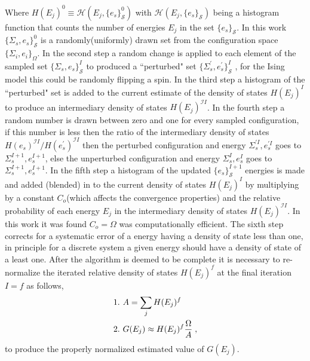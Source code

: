 \documentclass[aps,prl,reprint,superscriptaddress,showkeys]{revtex4-1}
\begin{document}
Where  $H(E_j)^0 \equiv \mathcal{H}(E_j,\{e_s\}_{\mathcal{S}}^0)$ with $\mathcal{H}(E_j,\{e_s\}_{\mathcal{S}})$ being a histogram function that counts the number of energies $E_j$ in the set $\{e_s\}_{\mathcal{S}}$. In this work $\{\Sigma_{s},e_s\}_{\mathcal{S}}^0$  is a randomly(uniformly) drawn set from the configuration space $\{ \Sigma_i, e_i \}_\Omega $. In the second step  a random change is applied to each element of the sampled set $\{\Sigma_{s},e_s\}_{\mathcal{S}}^I$ to produced a ``perturbed" set $ \{\Sigma_{s}^{'},e_s^{'}\}_{\mathcal{S}}^I$ , for the Ising model this could be randomly flipping a spin. In the third step a histogram of the ``perturbed" set is added to the current estimate of the density of states $H(E_j)^I$ to produce an intermediary density of states $H(E_j)^{\mathcal{I}I}$. In the fourth step a random number is drawn between zero and one for every sampled configuration, if this number is less then the ratio of the intermediary density of states $H(e_s)^{\mathcal{I}I}/H(e_s^{'})^{\mathcal{I}I}$ then the perturbed configuration and energy  $\Sigma_{s}^{'I},e_s^{'I}$  goes to $\Sigma_{s}^{I+1},e_s^{I+1}$,  else the unperturbed configuration and energy $\Sigma_{s}^{I},e_s^I$  goes to $\Sigma_{s}^{I+1},e_s^{I+1}$. In the fifth step a histogram of the updated $\{ e_s \}^{I+1}_{\mathcal{S}}$ energies is made and added (blended) in to the current density of states $H(E_j)^I$   by multiplying  by a constant $C_{o}$(which affects the convergence properties) and the relative probability of each energy $E_j$ in the  intermediary density of states $H(E_j)^{\mathcal{I}I}$. In this work it was found  $C_{o}=\Omega$ was computationally efficient. The sixth step corrects for a systematic error of a energy having a density of state less than one, in principle for a discrete system a given energy should have a density of state of a least one.  After the algorithm is deemed to be complete it is necessary to re-normalize the iterated relative density of states $H(E_j)^f$ at the final iteration $I=f$ as follows, 
\begin{equation}
\begin{split}
&1. \hspace{0.125cm} A = \sum_jH(E_j)^f\\
&2. \hspace{0.125cm} G(E_j)\approx H(E_j)^f \frac{\Omega}{A} \;,
\end{split}
\end{equation}
to produce the properly normalized estimated value of $G(E_j)$. 
\end{document}
